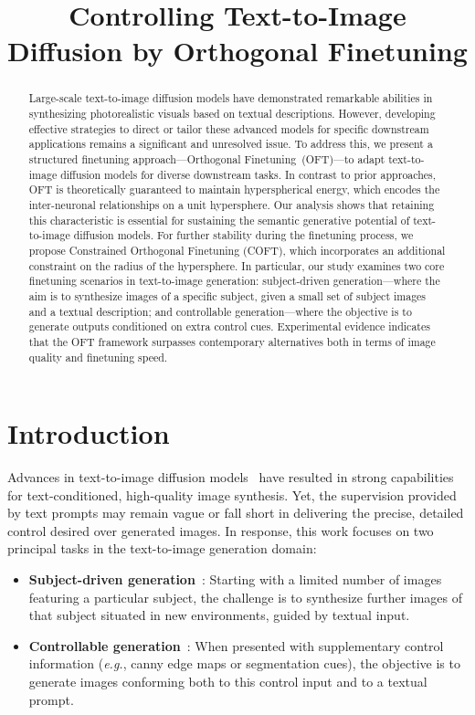 \title{Controlling Text-to-Image Diffusion by Orthogonal Finetuning}

\begin{abstract}
Large-scale text-to-image diffusion models have demonstrated remarkable abilities in synthesizing photorealistic visuals based on textual descriptions. However, developing effective strategies to direct or tailor these advanced models for specific downstream applications remains a significant and unresolved issue. To address this, we present a structured finetuning approach—Orthogonal Finetuning~(OFT)—to adapt text-to-image diffusion models for diverse downstream tasks. In contrast to prior approaches, OFT is theoretically guaranteed to maintain hyperspherical energy, which encodes the inter-neuronal relationships on a unit hypersphere. Our analysis shows that retaining this characteristic is essential for sustaining the semantic generative potential of text-to-image diffusion models. For further stability during the finetuning process, we propose Constrained Orthogonal Finetuning (COFT), which incorporates an additional constraint on the radius of the hypersphere. In particular, our study examines two core finetuning scenarios in text-to-image generation: subject-driven generation—where the aim is to synthesize images of a specific subject, given a small set of subject images and a textual description; and controllable generation—where the objective is to generate outputs conditioned on extra control cues. Experimental evidence indicates that the OFT framework surpasses contemporary alternatives both in terms of image quality and finetuning speed.
\end{abstract}

\section{Introduction}

Advances in text-to-image diffusion models~\cite{saharia2022photorealistic,ramesh2022hierarchical,rombach2022high} have resulted in strong capabilities for text-conditioned, high-quality image synthesis. Yet, the supervision provided by text prompts may remain vague or fall short in delivering the precise, detailed control desired over generated images. In response, this work focuses on two principal tasks in the text-to-image generation domain:

\begin{itemize}[leftmargin=*,nosep]

    \item \textbf{Subject-driven generation}~\cite{ruiz2023dreambooth}: Starting with a limited number of images featuring a particular subject, the challenge is to synthesize further images of that subject situated in new environments, guided by textual input.
    \item \textbf{Controllable generation}~\cite{zhang2023adding,mou2023t2i}: When presented with supplementary control information (\emph{e.g.}, canny edge maps or segmentation cues), the objective is to generate images conforming both to this control input and to a textual prompt.
\end{itemize}


